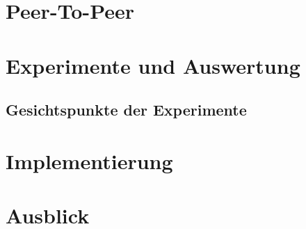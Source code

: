 \documentclass{book}
\begin{document}

%


\frontmatter

\tableofcontents
\listoffigures

\mainmatter


\chapter{Peer-To-Peer}





\chapter{Experimente und Auswertung}
\section{Gesichtspunkte der Experimente}
\chapter{Implementierung}
\chapter{Ausblick}



\end{document}
